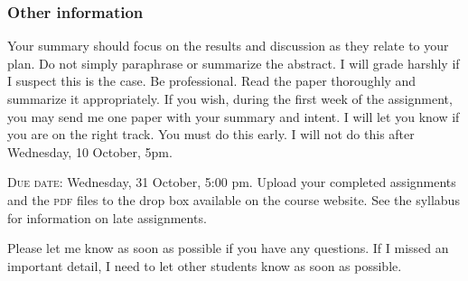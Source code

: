\documentclass[12pt]{article}
\begin{document}
\subsubsection*{Other information}

Your summary should focus on the results and discussion as they relate to your plan. Do not simply paraphrase or summarize the abstract. I will grade harshly if I suspect this is the case. Be professional. Read the paper thoroughly and summarize it appropriately. If you wish, during the first week of the assignment, you may send me one paper with your summary and intent. I will let you know if you are on the right track. You must do this early. I will not do this after Wednesday, 10 October, 5pm.

\textsc{Due date:} Wednesday, 31 October, 5:00 pm. Upload your completed assignments and the \textsc{pdf} files to the drop box available on the course website. See the syllabus for information on late assignments.

\vspace*{\baselineskip}

Please let me know as soon as possible if you have any questions. If I missed an important detail, I need to let other students know as soon as possible.
\end{document}
